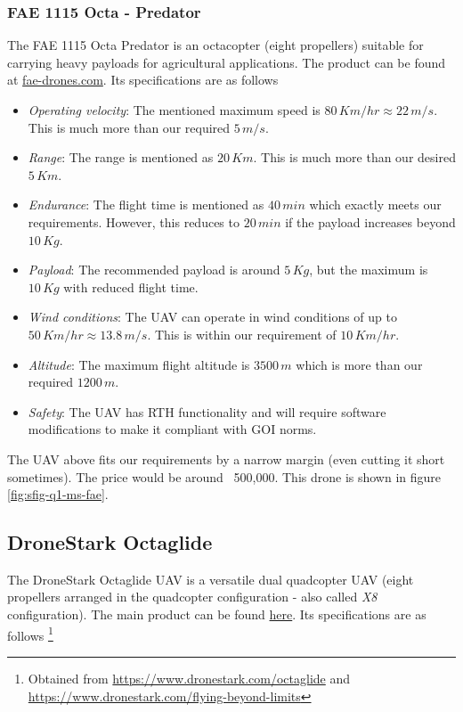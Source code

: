 \subsubsection*{FAE 1115 Octa - Predator}

The FAE 1115 Octa Predator is an octacopter (eight propellers) suitable for carrying heavy payloads for agricultural applications. The product can be found at \href{https://fae-drones.com/products/FAE-1115-Octa-PREDATOR-40.html}{fae-drones.com}. Its specifications are as follows

\begin{itemize}
    \item \textit{Operating velocity}: The mentioned maximum speed is $80\,Km/hr \approx 22\,m/s$. This is much more than our required $5\,m/s$.
    \item \textit{Range}: The range is mentioned as $20\,Km$. This is much more than our desired $5\,Km$.
    \item \textit{Endurance}: The flight time is mentioned as $40\,min$ which exactly meets our requirements. However, this reduces to $20\,min$ if the payload increases beyond $10\,Kg$.
    \item \textit{Payload}: The recommended payload is around $5\,Kg$, but the maximum is $10\,Kg$ with reduced flight time.
    \item \textit{Wind conditions}: The UAV can operate in wind conditions of up to $50\,Km/hr \approx 13.8\,m/s$. This is within our requirement of $10\,Km/hr$.
    \item \textit{Altitude}: The maximum flight altitude is $3500\,m$ which is more than our required $1200\,m$.
    \item \textit{Safety}: The UAV has RTH functionality and will require software modifications to make it compliant with GOI norms.
\end{itemize}

The UAV above fits our requirements by a narrow margin (even cutting it short sometimes). The price would be around \rupee~500,000. This drone is shown in figure \ref{fig:sfig-q1-ms-fae}.

\subsection*{DroneStark Octaglide}

The DroneStark Octaglide UAV is a versatile dual quadcopter UAV (eight propellers arranged in the quadcopter configuration - also called \emph{X8} configuration). The main product can be found \href{https://www.dronestark.com/octaglide}{here}. Its specifications are as follows 
\footnote{Obtained from \url{https://www.dronestark.com/octaglide} and \url{https://www.dronestark.com/flying-beyond-limits}}

